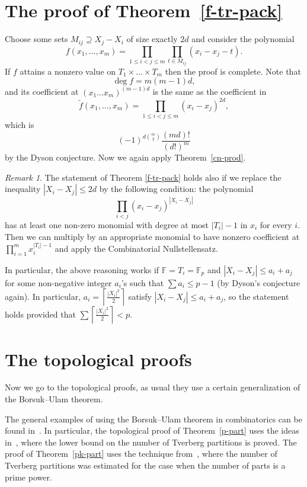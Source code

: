 \documentclass[12pt,a4paper]{amsart}
\theoremstyle{definition}
\theoremstyle{remark}
\newtheorem*{rem}{Remark}
\begin{document}
\section{The proof of Theorem~\ref{f-tr-pack}}
\label{f-tr-pack-sec}

Choose some sets $M_{ij}\supseteq X_j - X_i$ of size exactly $2d$ and consider the polynomial
$$
f(x_1, \ldots, x_m) = \prod_{1\le i<j\le m} \prod_{t\in M_{ij}} (x_i - x_j - t).
$$
If $f$ attains a nonzero value on $T_1\times\dots\times T_m$ then the proof is complete. Note that
$$
\deg f = m(m-1)d,
$$
and its coefficient at $(x_1\dots x_m)^{(m-1)d}$ is the same as the coefficient in
$$
\tilde f(x_1, \ldots, x_m) = \prod_{1\le i<j\le m} (x_i - x_j)^{2d},
$$
which is
$$
(-1)^{d\binom{m}{2}} \frac{(md)!}{(d!)^m}
$$
by the Dyson conjecture. Now we again apply Theorem~\ref{cn-prod}.

\begin{rem}
The statement of Theorem \ref{f-tr-pack} holds also if we replace the inequality $|X_i-X_j| \le 2d$ by the following condition: the polynomial
$$
\prod_{i<j} (x_i-x_j)^{|X_i-X_j|}
$$
has at least one non-zero monomial with degree at most $|T_i|-1$ in $x_i$ for every $i$. Then we can multiply by an appropriate monomial to have nonzero coefficient at $\prod_{i=1}^m x_i^{|T_i|-1}$ and apply the Combinatorial Nullstellensatz. 

In particular, the above reasoning works if $\mathbb F = T_i = {{\mathbb F_p}}$ and $|X_i-X_j|\leq a_i+a_j$ for some non-negative integer $a_i$'s such that $\sum a_i\leq p-1$ (by Dyson's conjecture again). In particular, $a_i=\left\lceil \frac{|X_i|^2}2\right\rceil $ satisfy $|X_i-X_j|\leq a_i+a_j$, so the statement holds provided that $\sum \left\lceil \frac{|X_i|^2}2\right\rceil <p$.
\end{rem}

\section{The topological proofs}
\label{top-sec}

Now we go to the topological proofs, as usual they use a certain generalization of the Borsuk--Ulam theorem.

The general examples of using the Borsuk--Ulam theorem in combinatorics can be found in~\cite{mat2003,ziv2004}. In particular, the topological proof of Theorem~\ref{p-part} uses the ideas in~\cite{vuziv1993}, where the lower bound on the number of Tverberg partitions is proved. The proof of Theorem~\ref{pk-part} uses the technique from~\cite{hell2007}, where the number of Tverberg partitions was estimated for the case when the number of parts is a prime power.
\end{document}
